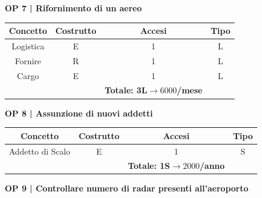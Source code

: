 

\newpage %

\textbf{\small OP 7 | Rifornimento di un aereo}\\

\begin{tabular}{ c c c c}
	\hline
	\textbf{Concetto} & \textbf{Costrutto} & \textbf{Accesi} & \textbf{Tipo}\\
	\hline
	\textsf{\small Logistica} & \textsf{\small E} & \textsf{\small 1} &  \textsf{\small L}\\
	\hline
	\textsf{\small Fornire} & \textsf{\small R} & \textsf{\small 1} &  \textsf{\small L}\\
	\hline
	\textsf{\small Cargo} & \textsf{\small E} & \textsf{\small 1} &  \textsf{\small L}\\
	\hline
	\textsf{\small } & \textsf{\small } & \textbf{Totale: 3L$\rightarrow 6000$/mese } \textsf{\small } & \textsf{\small }\\ %
	\hline
\end{tabular}

\vspace{.6cm}


\textbf{\small OP 8 | Assunzione di nuovi addetti}\\

\begin{tabular}{ c c c c}
	\hline
	\textbf{Concetto} & \textbf{Costrutto} & \textbf{Accesi} & \textbf{Tipo}\\
	\hline
	\textsf{\small Addetto di Scalo} & \textsf{\small E} & \textsf{\small 1} &  \textsf{\small S}\\
	\hline
	\textsf{\small } & \textsf{\small } & \textbf{Totale: 1S$\rightarrow 2000$/anno } \textsf{\small } & \textsf{\small }\\ %
	\hline
\end{tabular}

\vspace{.6cm}


\textbf{\small OP 9 | Controllare numero di radar presenti all'aeroporto }\\

